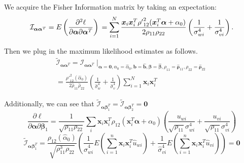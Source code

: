\documentclass[aap,authoryear, preprint]{imsart}
\numberwithin{equation}{section}
\theoremstyle{plain}
\begin{document}
We acquire the Fisher Information matrix by taking an expectation:
\begin{equation}
    \mathcal{I}_{\bm{\alpha}\bm{\alpha}^T} = E\left(\frac{\partial^2 \ell}{\partial \bm{\alpha} \partial \bm{\alpha}^T}\right)\\
    = \sum_{i=1}^{N} \frac{\bm{x}_i \bm{x}_i^T {\rho '}^2_{12}(\bm{x}_i^T\bm{\alpha}+\alpha_0)}{2\rho_{11}\rho_{22}} \left(
    \frac{1}{\sigma_{wi}^4} + \frac{1}{\sigma_{vi}^4}
    \right).
\end{equation}

\noindent Then we plug in the maximum likelihood estimates as follows.
\begin{equation}
\begin{multlined}
        \tilde{\mathcal{I}}_{\bm{\alpha}\bm{\alpha}^T} = \mathcal{I}_{\bm{\alpha}\bm{\alpha}^T}\mid_{
        \bm{\alpha}=\bm{0}, 
        \alpha_0 = \hat{\alpha}_0,
        \bm{b} = \bm{\hat{b}},
        \bm{\beta} = \bm{\hat{\beta}},
        {\rho}_{11} = \bm{\hat{\rho}}_{11},
        {\rho}_{22} = \bm{\hat{\rho}}_{22}}\\
        = \frac{{\rho '}^2_{12}({\hat{\alpha}_0})}{2\hat{\rho}_{11}\hat{\rho}_{22}} \left(\frac{1}{\hat{\sigma}_{w}^4} + \frac{1}{\hat{\sigma}_{v}^4} \right) \sum_{i=1}^{N} \bm{x}_i \bm{x}_i^T
    \end{multlined}
\end{equation}

\noindent Additionally, we can see that $\tilde{\mathcal{I}}_{\bm{\alpha}{\bm{\beta}_1^T}} =  \tilde{\mathcal{I}}_{\bm{\alpha}{\bm{\beta}_2^T}} = \bm{0}$
\begin{equation}
\frac{\partial \ell}{\partial \bm{\alpha} \partial\bm{\beta}_1}= 
    \frac{1}{\sqrt{\rho_{11}\rho_{22}}} \sum_i \bm{x}_i \bm{x}_i^T \rho_{12}(\bm{x}_i^T\bm{\alpha} + \alpha_0) \left( 
    \frac{u_{wi}}{\sqrt{\rho_{11}}\sigma_{wi}^4} + \frac{u_{vi}}{\sqrt{\rho_{11}}\sigma_{vi}^4}
    \right)
\end{equation}
$$
\tilde{\mathcal{I}}_{\bm{\alpha}{\bm{\beta}_1^T}} = 
\frac{\rho_{12}(\hat{\alpha}_0)}{\sqrt{\rho_{11}^3\rho_{22}}} \left(
\frac{1}{\hat{\sigma}_{wi}^4}
E\left( \sum_{i=1}^{n} \bm{x}_i \bm{x}_i^T \hat{u}_{wi}\right)
+\frac{1}{\hat{\sigma}_{vi}^4}
E\left( \sum_{i=1}^{n} \bm{x}_i \bm{x}_i^T \hat{u}_{vi} \right)
\right) = \bm{0}$$
\end{document}
